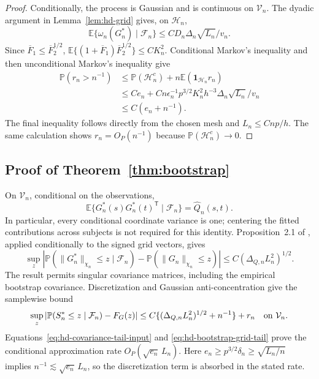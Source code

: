 \documentclass[12pt]{article}
\newcommand{\expect}{\mathbb{E}}
\newcommand{\prob}{\mathbb{P}}
\newcommand{\trans}{{\scriptscriptstyle\mathsf{T}}}
\numberwithin{equation}{section}
\begin{document}
\begin{proof}
Conditionally, the process is Gaussian and is continuous on
$\mathcal V_n$. The dyadic argument in Lemma~\ref{lem:hd-grid} gives,
on $\mathcal H_n$,
\[
 \expect\{\omega_n(G_n^*)\mid\mathcal F_n\}
 \le CD_n\Delta_n\sqrt{L_n}/v_n.
\]
Since $\overline F_1\le\overline F_2^{1/2}$,
$\expect\{(1+\overline F_1)\overline F_2^{1/2}\}
 \le CK_n^2$. Conditional Markov's inequality and then unconditional
Markov's inequality give
\begin{align*}
 \prob(r_n>n^{-1})
 &\le\prob(\mathcal H_n^c)
       +n\expect(\mathbf1_{\mathcal H_n}r_n)\\
 &\le Ce_n+
 Cn\epsilon_n^{-1}p^{3/2}K_n^2h^{-3}\Delta_n\sqrt{L_n}/v_n\\
 &\le C(e_n+n^{-1}).
\end{align*}
The final inequality follows directly from the chosen mesh and
$L_n\le Cnp/h$. The same calculation shows $r_n=O_P(n^{-1})$ because
$\prob(\mathcal H_n^c)\to0$.
\end{proof}

\subsection{Proof of Theorem~\ref{thm:bootstrap}}

On $\mathcal V_n$, conditional on the observations,
\[
 \expect\{G_n^*(s)G_n^*(t)^\trans\mid\mathcal F_n\}
 =\widehat Q_n(s,t).
\]
In particular, every conditional coordinate variance is one; centering
the fitted contributions across subjects is not required for this
identity. Proposition~2.1 of \citet{chernozhukov_et_al_2022}, applied
conditionally to the signed grid vectors, gives
\[
 \sup_z\left|\prob(\|G_n^*\|_{\chi_n}\le z\mid\mathcal F_n)
             -\prob(\|G_n\|_{\chi_n}\le z)\right|
 \le C(\Delta_{Q,n}L_n^2)^{1/2}.
\]
The result permits singular covariance matrices, including the empirical
bootstrap covariance. Discretization and Gaussian anti-concentration
give the samplewise bound
\begin{equation}
 \sup_z|\prob(S_n^*\le z\mid\mathcal F_n)-F_G(z)|
 \le C\{(\Delta_{Q,n}L_n^2)^{1/2}+n^{-1}\}+r_n
 \quad\hbox{on }\mathcal V_n.
 \label{eq:hd-bootstrap-continuous-comparison}
\end{equation}
Equations~\eqref{eq:hd-covariance-tail-input} and
\eqref{eq:hd-bootstrap-grid-tail} prove the conditional approximation
rate $O_P(\sqrt{e_n}\,L_n)$. Here
$e_n\ge p^{3/2}\delta_n\ge\sqrt{L_n/n}$ implies
$n^{-1}\lesssim\sqrt{e_n}\,L_n$, so the discretization term is
absorbed in the stated rate.
\end{document}
